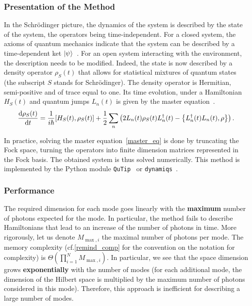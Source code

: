\subsubsection{Presentation of the Method}

In the Schrödinger picture, the dynamics of the system is described by the state of the system, the operators being time-independent. For a closed system, the axioms of quantum mechanics indicate that the system can be described by a time-dependent ket $\ket{\psi}$~\cite{principles_dirac}. For an open system interacting with the environment, the description needs to be modified. Indeed, the state is now described by a density operator $\rho_S(t)$ that allows for statistical mixtures of quantum states (the subscript $S$ stands for Schrödinger). The density operator is Hermitian, semi-positive and of trace equal to one. Its time evolution, under a Hamiltonian $H_S(t)$ and quantum jumps $L_n(t)$ is given by the master equation~\cite{explo_quant}.
\begin{equation} \label{master_eq}
    \timeDeriv{\rho_S(t)} = \ihbar \commutator{H_S(t)}{\rho_S(t)} + \frac{1}{2} \sum_{n} \left(2 L_n(t) \rho_S(t) L_n^\dagger(t) - \anticomm{L_n^\dagger(t) L_n(t)}{\rho}\right).
\end{equation}

In practice, solving the master equation~\autoref{master_eq} is done by truncating the Fock space, turning the operators into finite dimension matrices represented in the Fock basis. The obtained system is thus solved numerically. This method is implemented by the Python module \texttt{QuTip}~\cite{qutip} or \texttt{dynamiqs}~\cite{dynamiqs}.

\subsubsection{Performance}

The required dimension for each mode goes linearly with the \textbf{maximum} number of photons expected for the mode. In particular, the method fails to describe Hamiltonians that lead to an increase of the number of photons in time. More rigorously, let us denote $M_{\max, i}$ the maximal number of photons per mode. The memory complexity (cf.\@ \autoref{remind_comp} for the convention on the notation for complexity) is $\Theta\left(\prod_{i = 1}^N M_{\max, i}\right)$. In particular, we see that the space dimension grows \textbf{exponentially} with the number of modes (for each additional mode, the dimension of the Hilbert space is multiplied by the maximum number of photons considered in this mode). Therefore, this approach is inefficient for describing a large number of modes.